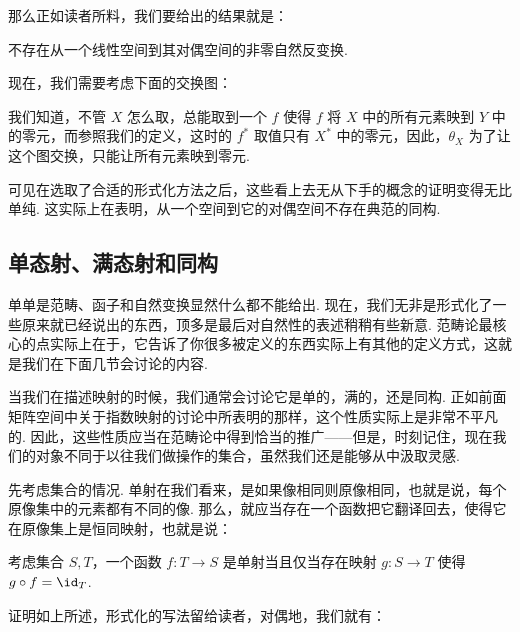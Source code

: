 那么正如读者所料，我们要给出的结果就是：

\begin{example}{}{}
    不存在从一个线性空间到其对偶空间的非零自然反变换.

    现在，我们需要考虑下面的交换图：

    \begin{center}
    \end{center}

    我们知道，不管 $X$ 怎么取，总能取到一个 $f$ 使得 $f$ 将 $X$ 中的所有元素映到 $Y$ 中的零元，而参照我们的定义，这时的 $f^*$ 取值只有 $X^*$ 中的零元，因此，$\theta_X$ 为了让这个图交换，只能让所有元素映到零元.
\end{example}

可见在选取了合适的形式化方法之后，这些看上去无从下手的概念的证明变得无比单纯. 这实际上在表明，从一个空间到它的对偶空间不存在典范的同构.

\subsection{单态射、满态射和同构}

单单是范畴、函子和自然变换显然什么都不能给出. 现在，我们无非是形式化了一些原来就已经说出的东西，顶多是最后对自然性的表述稍稍有些新意. 范畴论最核心的点实际上在于，它告诉了你很多被定义的东西实际上有其他的定义方式，这就是我们在下面几节会讨论的内容.

当我们在描述映射的时候，我们通常会讨论它是单的，满的，还是同构. 正如前面矩阵空间中关于指数映射的讨论中所表明的那样，这个性质实际上是非常不平凡的. 因此，这些性质应当在范畴论中得到恰当的推广——但是，时刻记住，现在我们的对象不同于以往我们做操作的集合，虽然我们还是能够从中汲取灵感.

先考虑集合的情况. 单射在我们看来，是如果像相同则原像相同，也就是说，每个原像集中的元素都有不同的像. 那么，就应当存在一个函数把它翻译回去，使得它在原像集上是恒同映射，也就是说：

\begin{lemma}{}{}
    考虑集合 $S, T$，一个函数 $f\colon T \to S$ 是单射当且仅当存在映射 $g\colon S \to T$ 使得 $g \circ f = \id_T$.
\end{lemma}

证明如上所述，形式化的写法留给读者，对偶地，我们就有：


